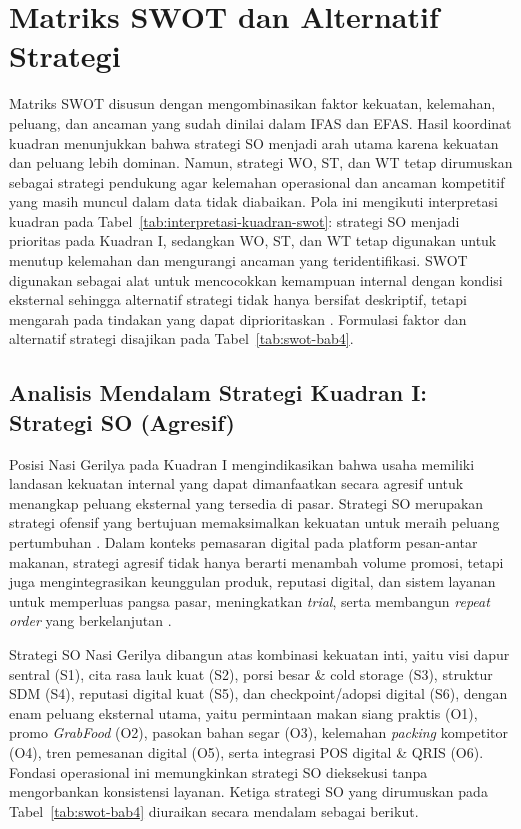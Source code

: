 \section{Matriks SWOT dan Alternatif Strategi}
Matriks SWOT disusun dengan mengombinasikan faktor kekuatan, kelemahan, peluang, dan ancaman yang sudah dinilai dalam IFAS dan EFAS. Hasil koordinat kuadran menunjukkan bahwa strategi SO menjadi arah utama karena kekuatan dan peluang lebih dominan. Namun, strategi WO, ST, dan WT tetap dirumuskan sebagai strategi pendukung agar kelemahan operasional dan ancaman kompetitif yang masih muncul dalam data tidak diabaikan. Pola ini mengikuti interpretasi kuadran pada Tabel~\ref{tab:interpretasi-kuadran-swot}: strategi SO menjadi prioritas pada Kuadran I, sedangkan WO, ST, dan WT tetap digunakan untuk menutup kelemahan dan mengurangi ancaman yang teridentifikasi. SWOT digunakan sebagai alat untuk mencocokkan kemampuan internal dengan kondisi eksternal sehingga alternatif strategi tidak hanya bersifat deskriptif, tetapi mengarah pada tindakan yang dapat diprioritaskan \parencite{gurel2017swot,david2023strategicmanagement,rangkuti2016analisisSWOT}. Formulasi faktor dan alternatif strategi disajikan pada Tabel~\ref{tab:swot-bab4}.

\subsection{Analisis Mendalam Strategi Kuadran I: Strategi SO (Agresif)}
Posisi Nasi Gerilya pada Kuadran I mengindikasikan bahwa usaha memiliki landasan kekuatan internal yang dapat dimanfaatkan secara agresif untuk menangkap peluang eksternal yang tersedia di pasar. Strategi SO merupakan strategi ofensif yang bertujuan memaksimalkan kekuatan untuk meraih peluang pertumbuhan \parencite{david2023strategicmanagement,rangkuti2016analisisSWOT}. Dalam konteks pemasaran digital pada platform pesan-antar makanan, strategi agresif tidak hanya berarti menambah volume promosi, tetapi juga mengintegrasikan keunggulan produk, reputasi digital, dan sistem layanan untuk memperluas pangsa pasar, meningkatkan \textit{trial}, serta membangun \textit{repeat order} yang berkelanjutan \parencite{chaffey2022digitalmarketing,kotler2023principlesmarketing}.

Strategi SO Nasi Gerilya dibangun atas kombinasi kekuatan inti, yaitu visi dapur sentral (S1), cita rasa lauk kuat (S2), porsi besar \& cold storage (S3), struktur SDM (S4), reputasi digital kuat (S5), dan checkpoint/adopsi digital (S6), dengan enam peluang eksternal utama, yaitu permintaan makan siang praktis (O1), promo \textit{GrabFood} (O2), pasokan bahan segar (O3), kelemahan \textit{packing} kompetitor (O4), tren pemesanan digital (O5), serta integrasi POS digital \& QRIS (O6). Fondasi operasional ini memungkinkan strategi SO dieksekusi tanpa mengorbankan konsistensi layanan. Ketiga strategi SO yang dirumuskan pada Tabel~\ref{tab:swot-bab4} diuraikan secara mendalam sebagai berikut.

